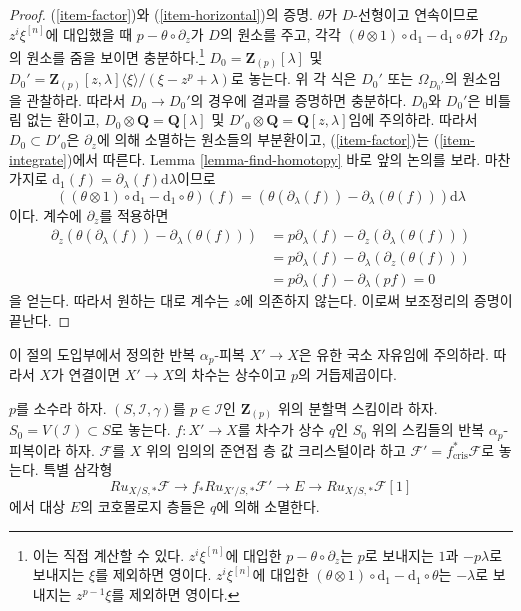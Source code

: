 \begin{proof}
\medskip\noindent
(\ref{item-factor})와 (\ref{item-horizontal})의 증명.
$\theta$가 $D$-선형이고 연속이므로 $z^i\xi^{[n]}$에 대입했을 때
$p - \theta \circ \partial_z$가 $D$의 원소를 주고, 각각
$(\theta \otimes 1) \circ \text{d}_1 - \text{d}_1 \circ \theta$가
$\Omega_D$의 원소를 줌을 보이면 충분하다.\footnote{이는 직접 계산할
수 있다. $z^i\xi^{[n]}$에 대입한 $p - \theta \circ \partial_z$는
$p$로 보내지는 $1$과 $-p\lambda$로 보내지는 $\xi$를 제외하면 영이다.
$z^i\xi^{[n]}$에 대입한
$(\theta \otimes 1) \circ \text{d}_1 - \text{d}_1 \circ \theta$는
$-\lambda$로 보내지는 $z^{p - 1}\xi$를 제외하면 영이다.}
$D_0 = \mathbf{Z}_{(p)}[\lambda]$ 및
$D_0' = \mathbf{Z}_{(p)}[z, \lambda]\langle \xi \rangle/(\xi - z^p + \lambda)$로
놓는다. 위 각 식은 $D_0'$ 또는 $\Omega_{D_0'}$의 원소임을 관찰하라.
따라서 $D_0 \to D_0'$의 경우에 결과를 증명하면 충분하다. $D_0$와
$D_0'$은 비틀림 없는 환이고,
$D_0 \otimes \mathbf{Q} = \mathbf{Q}[\lambda]$ 및
$D'_0 \otimes \mathbf{Q} = \mathbf{Q}[z, \lambda]$임에 주의하라.
따라서 $D_0 \subset D'_0$은 $\partial_z$에 의해 소멸하는 원소들의
부분환이고, (\ref{item-factor})는 (\ref{item-integrate})에서 따른다.
Lemma \ref{lemma-find-homotopy} 바로 앞의 논의를 보라. 마찬가지로
$\text{d}_1(f) = \partial_\lambda(f)\text{d}\lambda$이므로
$$
\left((\theta \otimes 1) \circ \text{d}_1 - \text{d}_1 \circ \theta\right)(f)
=
\left(\theta(\partial_\lambda(f)) - \partial_\lambda(\theta(f))\right)
\text{d}\lambda
$$
이다. 계수에 $\partial_z$를 적용하면
\begin{align*}
\partial_z\left(
\theta(\partial_\lambda(f)) - \partial_\lambda(\theta(f))
\right)
& =
p \partial_\lambda(f) - \partial_z(\partial_\lambda(\theta(f))) \\
& =
p \partial_\lambda(f) - \partial_\lambda(\partial_z(\theta(f))) \\
& =
p \partial_\lambda(f) - \partial_\lambda(p f) = 0
\end{align*}
을 얻는다. 따라서 원하는 대로 계수는 $z$에 의존하지 않는다.
이로써 보조정리의 증명이 끝난다.
\end{proof}

\noindent
이 절의 도입부에서 정의한 반복 $\alpha_p$-피복 $X' \to X$은 유한
국소 자유임에 주의하라. 따라서 $X$가 연결이면 $X' \to X$의 차수는
상수이고 $p$의 거듭제곱이다.

\begin{lemma}
\label{lemma-pullback-along-p-power-cover}
$p$를 소수라 하자. $(S, \mathcal{I}, \gamma)$를 $p \in \mathcal{I}$인
$\mathbf{Z}_{(p)}$ 위의 분할멱 스킴이라 하자.
$S_0 = V(\mathcal{I}) \subset S$로 놓는다. $f : X' \to X$를 차수가
상수 $q$인 $S_0$ 위의 스킴들의 반복 $\alpha_p$-피복이라 하자.
$\mathcal{F}$를 $X$ 위의 임의의 준연접 층 값 크리스털이라 하고
$\mathcal{F}' = f_{\text{cris}}^*\mathcal{F}$로 놓는다. 특별 삼각형
$$
Ru_{X/S, *}\mathcal{F}
\longrightarrow
f_*Ru_{X'/S, *}\mathcal{F}'
\longrightarrow
E
\longrightarrow
Ru_{X/S, *}\mathcal{F}[1]
$$
에서 대상 $E$의 코호몰로지 층들은 $q$에 의해 소멸한다.
\end{lemma}

